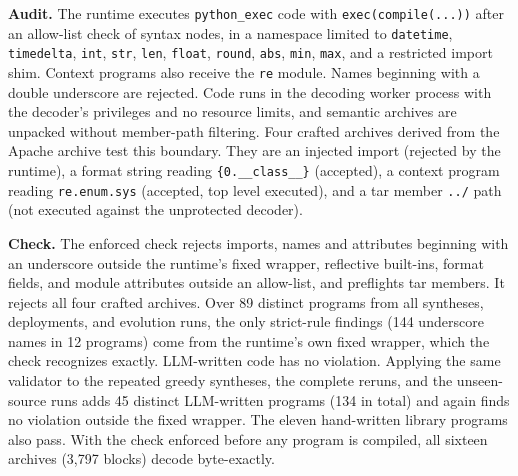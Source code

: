 \textbf{Audit.} The runtime executes \texttt{python\_exec} code with \texttt{exec(compile(...))} after an allow-list check of syntax nodes, in a namespace limited to \texttt{datetime}, \texttt{timedelta}, \texttt{int}, \texttt{str}, \texttt{len}, \texttt{float}, \texttt{round}, \texttt{abs}, \texttt{min}, \texttt{max}, and a restricted import shim. Context programs also receive the \texttt{re} module. Names beginning with a double underscore are rejected. Code runs in the decoding worker process with the decoder\textquoteright s privileges and no resource limits, and semantic archives are unpacked without member-path filtering. Four crafted archives derived from the Apache archive test this boundary. They are an injected import (rejected by the runtime), a format string reading \texttt{\{0.\_\_class\_\_\}} (accepted), a context program reading \texttt{re.enum.sys} (accepted, top level executed), and a tar member \texttt{../} path (not executed against the unprotected decoder).

\textbf{Check.} The enforced check rejects imports, names and attributes beginning with an underscore outside the runtime\textquoteright s fixed wrapper, reflective built-ins, format fields, and module attributes outside an allow-list, and preflights tar members. It rejects all four crafted archives. Over 89 distinct programs from all syntheses, deployments, and evolution runs, the only strict-rule findings (144 underscore names in 12 programs) come from the runtime\textquoteright s own fixed wrapper, which the check recognizes exactly. LLM-written code has no violation. Applying the same validator to the repeated greedy syntheses, the complete reruns, and the unseen-source runs adds 45 distinct LLM-written programs (134 in total) and again finds no violation outside the fixed wrapper. The eleven hand-written library programs also pass. With the check enforced before any program is compiled, all sixteen archives (3,797 blocks) decode byte-exactly.

